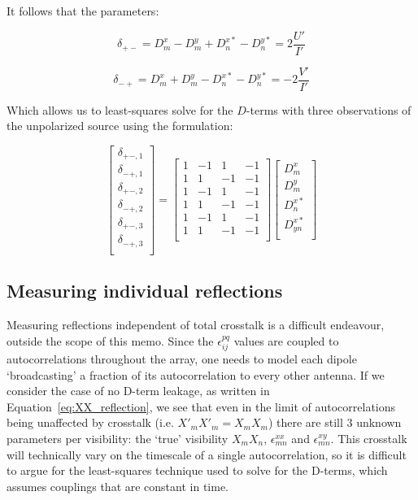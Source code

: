 \documentclass[10pt,a4paper,notitlepage]{article}
\begin{document}
It follows that the parameters:

\begin{equation}
\delta_{+-} = D^x_m - D^y_m + D^{x*}_n - D^{y*}_n = 2\frac{U'}{I'}
\end{equation}

\begin{equation}
\delta_{-+} = D^x_m + D^y_m - D^{x*}_n - D^{y*}_n = -2\frac{V'}{I'}
\end{equation}

\noindent Which allows us to least-squares solve for the $D$-terms with three observations of the unpolarized source using the formulation:

\begin{equation}
\begin{bmatrix}
\delta_{+-,1} \\
\delta_{-+,1} \\
\delta_{+-,2} \\
\delta_{-+,2} \\
\delta_{+-,3} \\
\delta_{-+,3} \\
\end{bmatrix}
=
\begin{bmatrix}
1 & -1 & 1 & -1 \\
1 & 1 & -1 & -1 \\
1 & -1 & 1 & -1 \\
1 & 1 & -1 & -1 \\
1 & -1 & 1 & -1 \\
1 & 1 & -1 & -1 \\
\end{bmatrix}
\begin{bmatrix}
D^x_{m}\\
D^y_{m}\\
D^{x*}_{n}\\
D^{x*}_{yn}\\
\end{bmatrix}
\end{equation}

\subsection{Measuring individual reflections}
\label{subsec:method_reflections}

Measuring reflections independent of total crosstalk is a difficult endeavour, outside the scope of this memo. Since the $\epsilon^{pq}_{ij}$ values are coupled to autocorrelations throughout the array, one needs to model each dipole `broadcasting' a fraction of its autocorrelation to every other antenna. If we consider the case of no D-term leakage, as written in Equation~\ref{eq:XX_reflection}, we see that even in the limit of autocorrelations being unaffected by crosstalk (i.e. $X'_mX'_m=X_mX_m$) there are still 3 unknown parameters per visibility: the `true' visibility $X_mX_n$, $\epsilon^{xx}_{mn}$ and $\epsilon^{xy}_{mn}$. This crosstalk will technically vary on the timescale of a single autocorrelation, so it is difficult to argue for the least-squares technique used to solve for the D-terms, which assumes couplings that are constant in time.
\end{document}

